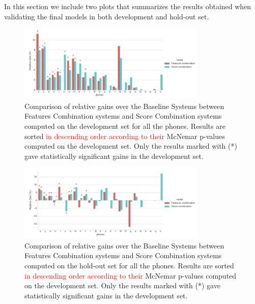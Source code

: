 In this section we include two plots that summarizes the results obtained when validating the final models in both development and hold-out set.

\begin{figure}[H]
	\centering
	\includegraphics[width=0.8\textwidth]{files/figures/results/relatives/relatives-fusion-systems-dev-all.png}
	\caption{Comparison of relative gains over the Baseline Systems
	between Features Combination systems and Score Combination systems
	computed on the development set for all the phones.
	Results are sorted \textcolor{red}{in descending order according to their}
	McNemar p-values computed on the development set.
	Only the results marked with (*) gave statistically significant gains in the development set.}
	\label{fig:fusionAllDev}
\end{figure}

\begin{figure}[H]
	\centering
	\includegraphics[width=0.8\textwidth]{files/figures/results/relatives/relative-fusion-systems-heldout-all.png}
	\caption{
		Comparison of relative gains over the Baseline Systems
		between Features Combination systems and Score Combination systems
		computed on the hold-out set for all the phones.
		Results are sorted \textcolor{red}{in descending order according to their}
		McNemar p-values computed on the development set.
		Only the results marked with (*) gave statistically significant gains in the development set.
	}
	\label{fig:fusionAllHeldout}
\end{figure}
